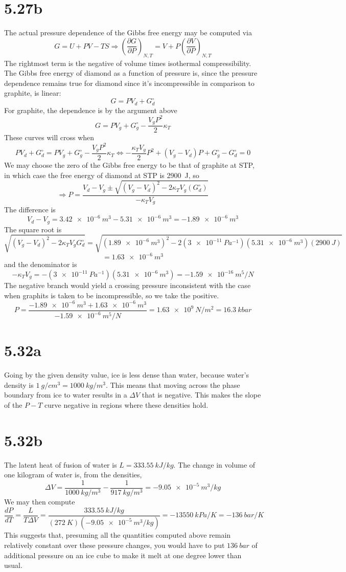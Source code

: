\documentclass{article}
\begin{document}
\section*{5.27b}
The actual pressure dependence of the Gibbs free energy may be computed via
\[G=U+PV-TS\Rightarrow \left( \frac{\partial G}{\partial P} \right)_{N,T}=V+P\left( \frac{\partial V}{\partial P} \right)_{N,T}\]
The rightmost term is the negative of volume times isothermal compressibility. The Gibbs free energy of diamond as a function of pressure is, since the pressure dependence remains true for diamond since it's incompressible in comparison to graphite, is linear:
\[G=PV_{d}+G_{d}^{\circ}\]
For graphite, the dependence is by the argument above
\[G=PV_{g}+G_{g}^{\circ}-\frac{V_{g}P^{2}}{2}\kappa_{T}\]
These curves will cross when
\[PV_{d}+G_{d}^{\circ}=PV_{g}+G_{g}^{\circ}-\frac{V_{g}P^{2}}{2}\kappa_{T}\Leftrightarrow-\frac{\kappa_{T}V_{g}}{2}P^{2}+(V_{g}-V_{d})P+G_{g}^{\circ}-G_{d}^{\circ}=0\]
We may choose the zero of the Gibbs free energy to be that of graphite at STP, in which case the free energy of diamond at STP is \SI{2900}{J}, so
\[\Rightarrow P=\frac{V_{d}-V_{g}\pm\sqrt{(V_{g}-V_{d})^{2}-2\kappa_{T}V_{g}(G_{d}^{\circ})}}{-\kappa_{T}V_{g}}\]
The difference is
\[V_{d}-V_{g}=\SI{3.42e-6}{m^{3}}-\SI{5.31e-6}{m^{3}}=\SI{-1.89e-6}{m^{3}}\]
The square root is
\[\sqrt{(V_{g}-V_{d})^{2}-2\kappa_{T}V_{g}G^{\circ}_{d}}=\sqrt{(\SI{1.89e-6}{m^{3}})^{2}-2(\SI{3e-11}{Pa^{-1}})(\SI{5.31e-6}{m^{3}})(\SI{2900}{J})}\]\[=\SI{1.63e-6}{m^{3}}\]
and the denominator is
\[-\kappa_{T}V_{g}=-(\SI{3e-11}{Pa^{-1}})(\SI{5.31e-6}{m^{3}})=-\SI{1.59e-16}{m^{5}/N}\]
The negative branch would yield a crossing pressure inconsistent with the case when graphits is taken to be incompressible, so we take the positive.
\[P=\frac{\SI{-1.89e-6}{m^{3}}+\SI{1.63e-6}{m^{3}}}{\SI{-1.59e-6}{m^{5}/N}}=\SI{1.63e9}{N/m^{2}}=\SI{16.3}{kbar}\]

\section*{5.32a}
Going by the given density value, ice is less dense than water, because water's density is $\SI{1}{g/cm^{3}}=\SI{1000}{kg/m^{3}}$. This means that moving across the phase boundary from ice to water results in a $\Delta V$ that is negative. This makes the slope of the $P-T$ curve negative in regions where these densities hold.

\section*{5.32b}
The latent heat of fusion of water is $L=\SI{333.55}{kJ/kg}$. The change in volume of one kilogram of water is, from the densities,
\[\Delta V= \frac{1}{\SI{1000}{kg/m^{3}}}-\frac{1}{\SI{917}{kg/m^{3}}}=\SI{-9.05e-5}{m^{3}/kg}\]
We may then compute
\[\frac{dP}{dT}=\frac{L}{T\Delta V}=\frac{\SI{333.55}{kJ/kg}}{(\SI{272}{K})(\SI{-9.05e-5}{m^{3}/kg})}=\SI{-13550}{kPa/K}=-\SI{136}{bar/K}\]
This suggests that, presuming all the quantities computed above remain relatively constant over these pressure changes, you would have to put $\SI{136}{bar}$ of additional pressure on an ice cube to make it melt at one degree lower than usual.
\end{document}
